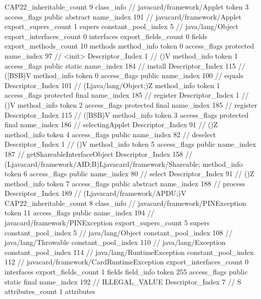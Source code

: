 {{{{{				}
			}
			CAP22_inheritable_count	9
		}
		class_info {		// javacard/framework/Applet
			token	3
			access_flags	public abstract
			name_index	191		// javacard/framework/Applet
			export_supers_count	1
			supers {
				constant_pool_index	5		// java/lang/Object
			}
			export_interfaces_count	0
			interfaces {
			}
			export_fields_count	0
			fields {
			}
			export_methods_count	10
			methods {
				method_info {
					token	0
					access_flags	protected
					name_index	97		// <init>
					Descriptor_Index	1		// ()V
				}
				method_info {
					token	1
					access_flags	public static
					name_index	184		// install
					Descriptor_Index	115		// ([BSB)V
				}
				method_info {
					token	0
					access_flags	public
					name_index	100		// equals
					Descriptor_Index	101		// (Ljava/lang/Object;)Z
				}
				method_info {
					token	1
					access_flags	protected final
					name_index	185		// register
					Descriptor_Index	1		// ()V
				}
				method_info {
					token	2
					access_flags	protected final
					name_index	185		// register
					Descriptor_Index	115		// ([BSB)V
				}
				method_info {
					token	3
					access_flags	protected final
					name_index	186		// selectingApplet
					Descriptor_Index	91		// ()Z
				}
				method_info {
					token	4
					access_flags	public
					name_index	82		// deselect
					Descriptor_Index	1		// ()V
				}
				method_info {
					token	5
					access_flags	public
					name_index	187		// getShareableInterfaceObject
					Descriptor_Index	158		// (Ljavacard/framework/AID;B)Ljavacard/framework/Shareable;
				}
				method_info {
					token	6
					access_flags	public
					name_index	80		// select
					Descriptor_Index	91		// ()Z
				}
				method_info {
					token	7
					access_flags	public abstract
					name_index	188		// process
					Descriptor_Index	189		// (Ljavacard/framework/APDU;)V
				}
			}
			CAP22_inheritable_count	8
		}
		class_info {		// javacard/framework/PINException
			token	11
			access_flags	public
			name_index	194		// javacard/framework/PINException
			export_supers_count	5
			supers {
				constant_pool_index	5		// java/lang/Object
				constant_pool_index	108		// java/lang/Throwable
				constant_pool_index	110		// java/lang/Exception
				constant_pool_index	114		// java/lang/RuntimeException
				constant_pool_index	112		// javacard/framework/CardRuntimeException
			}
			export_interfaces_count	0
			interfaces {
			}
			export_fields_count	1
			fields {
			field_info {
				token	255
				access_flags	public static final
				name_index	192		// ILLEGAL_VALUE
				Descriptor_Index	7		// S
				attributes_count	1
				attributes {
}}}}}}
